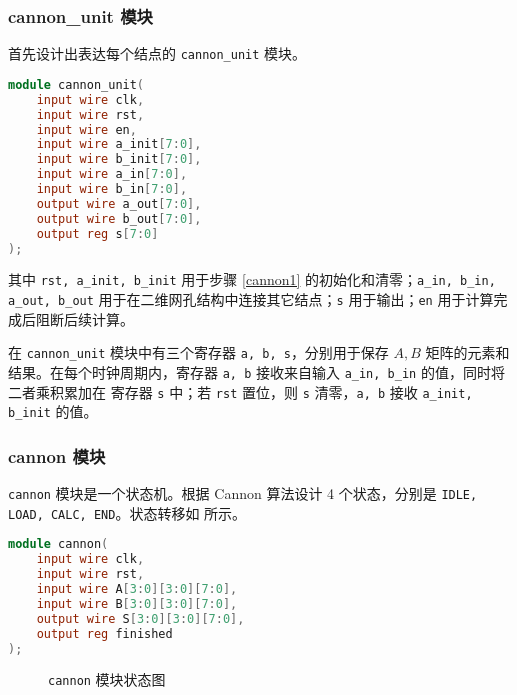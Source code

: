\documentclass{zjureport-zh}
\begin{document}
\subsubsection{cannon\_unit 模块}
\par 首先设计出表达每个结点的 \texttt{cannon\_unit} 模块。
\begin{lstlisting}[language=verilog]
module cannon_unit(
	input wire clk,
	input wire rst,
	input wire en,
	input wire a_init[7:0],
	input wire b_init[7:0],
	input wire a_in[7:0],
	input wire b_in[7:0],
	output wire a_out[7:0],
	output wire b_out[7:0],
	output reg s[7:0]
);
\end{lstlisting}
\par 其中 \texttt{rst, a\_init, b\_init} 用于步骤 \ref{cannon1} 的初始化和清零；\texttt{a\_in, b\_in, a\_out, b\_out} 用于在二维网孔结构中连接其它结点；\texttt{s} 用于输出；\texttt{en} 用于计算完成后阻断后续计算。
\par 在 \texttt{cannon\_unit} 模块中有三个寄存器 \texttt{a, b, s}，分别用于保存 $A,B$ 矩阵的元素和结果。在每个时钟周期内，寄存器 \texttt{a, b} 接收来自输入 \texttt{a\_in, b\_in} 的值，同时将二者乘积累加在 寄存器 \texttt{s} 中；若 \texttt{rst} 置位，则 \texttt{s} 清零，\texttt{a, b} 接收 \texttt{a\_init, b\_init} 的值。

\subsubsection{cannon 模块}
\par \texttt{cannon} 模块是一个状态机。根据 Cannon 算法设计 4 个状态，分别是 \texttt{IDLE, LOAD, CALC, END}。状态转移如 所示。

\begin{lstlisting}[language=verilog]
module cannon(
	input wire clk,
	input wire rst,
	input wire A[3:0][3:0][7:0],
	input wire B[3:0][3:0][7:0],
	output wire S[3:0][3:0][7:0],
	output reg finished
);
\end{lstlisting}

\begin{figure}[h]
	\centering
	\caption{\texttt{cannon} 模块状态图} \label{cannon_statefig}
\end{figure}
\end{document}
